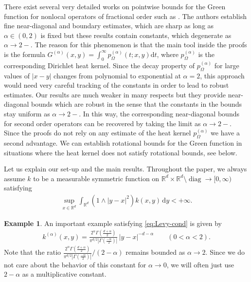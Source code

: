 \documentclass[reqno]{amsart}
\theoremstyle{plain}
\theoremstyle{definition}
\newtheorem{example}[theorem]{Example}
\numberwithin{equation}{section}
\newcommand{\R}{\mathbb{R}}
\newcommand{\Rd}{\mathbb{R}^d}
\renewcommand{\d}{\mathrm{d}}
\newcommand{\dy} {\, \mathrm{d}y}
\begin{document}
There exist several very detailed works on pointwise bounds for the Green function for nonlocal operators of fractional order such as \cite{CKS10a,BGR14}. The authors establish fine near-diagonal and boundary estimates, which are sharp as long as $\alpha \in (0,2)$ is fixed but these results contain constants, which degenerate as $\alpha \to 2-$. The reason for this phenomenon is that the main tool inside the proofs is the formula $G^{(\alpha)} (x,y) = \int_0^\infty p^{(\alpha)}_\Omega(t;x,y) \d t$, where $p^{(\alpha)}_\Omega$ is the corresponding Dirichlet heat kernel. Since the decay property of $p^{(\alpha)}_\Omega$ for large values of $|x-y|$ changes from polynomial to exponential at $\alpha =2$, this approach would need very careful tracking of the constants in order to lead to robust estimates. Our results are much weaker in many respects but they provide near-diagonal bounds which are robust in the sense that the constants in the bounds stay uniform as $\alpha \to 2-$. In this way, the corresponding near-diagonal bounds for second order operators can be recovered by taking the limit as $\alpha \to 2-$. Since the proofs do not rely on any estimate of the heat kernel $p^{(\alpha)}_\Omega$ we have a second advantage. We can establish rotational bounds for the Green function in situations where the heat kernel does not satisfy rotational bounds, see  below.

Let us explain our set-up and the main results. Throughout the paper, we always assume $k$ to be a measurable symmetric function on $\R^d \times \R^d \setminus \operatorname{diag} \to [0, \infty)$ satisfying 
\begin{align} \label{eq:Levy-cond}
\sup_{x \in \Rd} \int_{\Rd} \left( 1 \land |y-x|^2 \right) k(x,y) \dy  < +\infty.
\end{align}

\begin{example} \label{ex:alpha-stable}
	An important example satisfying \eqref{eq:Levy-cond} is given by
	\begin{align*}
	k^{(\alpha)}(x, y) = \tfrac{2^\alpha \Gamma(\frac{d+\alpha}{2})}{\pi^{d/2} |\Gamma(\frac{-\alpha}{2})|}  \, |y-x|^{-d-\alpha} \qquad (0 < \alpha < 2).
	\end{align*}
Note that the ratio $\tfrac{2^\alpha \Gamma(\frac{d+\alpha}{2})}{\pi^{d/2} |\Gamma(\frac{-\alpha}{2})|} / (2-\alpha)$ remains bounded as $\alpha \rightarrow 2$. Since we do not care about the behavior of this constant for $\alpha \to 0$, we will often just use $2-\alpha$ as a multiplicative constant.
\end{example}
\end{document}
